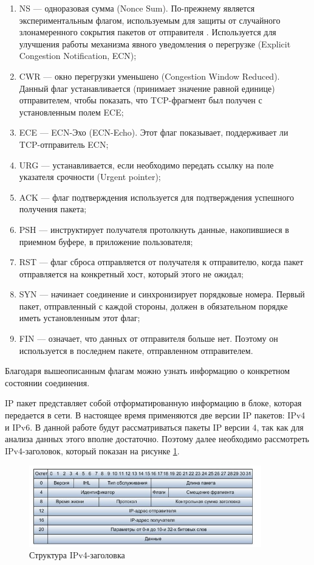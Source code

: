 \documentclass[bachelor, och, coursework]{SCWorks}
\begin{document}
    \begin{enumerate}
      \item NS --- одноразовая сумма (Nonce Sum). По-прежнему является экспериментальным флагом, используемым для защиты от случайного
      злонамеренного сокрытия пакетов от отправителя \cite{tcpflags}. Используется для улучшения работы механизма явного уведомления 
      о перегрузке (Explicit Congestion Notification, ECN);
      \item CWR --- окно перегрузки уменьшено (Congestion Window Reduced). 
      Данный флаг устанавливается (принимает значение равной единице) отправителем, чтобы показать, что TCP-фрагмент был
      получен с установленным полем ECE;
      \item ECE --- ECN-Эхо (ECN-Echo). Этот флаг показывает, поддерживает ли TCP-отправитель ECN;
      \item URG --- устанавливается, если необходимо передать ссылку на поле указателя срочности (Urgent pointer);
      \item ACK --- флаг подтверждения используется для подтверждения успешного получения пакета;
      \item PSH --- инструктирует получателя протолкнуть данные, накопившиеся в приемном буфере, в приложение пользователя;
      \item RST --- флаг сброса отправляется от получателя к отправителю, когда пакет отправляется на конкретный хост, который этого не ожидал;
      \item SYN --- начинает соединение и синхронизирует порядковые номера. Первый пакет, отправленный с каждой стороны, должен в обязательном порядке иметь установленным этот флаг;
      \item FIN --- означает, что данных от отправителя больше нет. Поэтому он используется в последнем пакете, отправленном отправителем.
    \end{enumerate}


    Благодаря вышеописанным флагам можно узнать информацию о конкретном состоянии соединения.
    
    IP пакет представляет собой отформатированную информацию в блоке, которая передается в сети. В настоящее время применяются две версии IP пакетов: IPv4 и IPv6.    
    В данной работе будут рассматриваться пакеты IP версии 4, 
    так как для анализа данных этого вполне достаточно. Поэтому далее необходимо рассмотреть IPv4-заголовок, который показан на рисунке \ref{ipv4-header}.

    \begin{figure}[H]
      \centering
      \includegraphics[width=0.9\textwidth]{photo/ipv4-header.png}
      \caption{Структура IPv4-заголовка}
      \label{ipv4-header}
    \end{figure}
\end{document}
